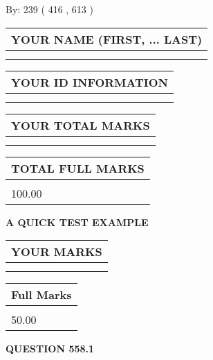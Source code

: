 \documentclass[12pt]{article}
\begin{document}
   
\hspace{1.0in} By: 
 239 ( 416 ,  613 )
   
   
   
   
\newpage 
\setcounter{page}{ 
   558001 } 
   
   
   
   
\noindent\begin{tabular}{|l|}
\hline
YOUR NAME (FIRST, ... LAST)  \\
\hline
 \\ 
 \\ 
\hline
\end{tabular}
\hspace{0.05in} \begin{tabular}{|l|}
\hline
 YOUR   ID   INFORMATION  \\
\hline
 \\ 
 \\ 
\hline
\end{tabular}
   
   
\vspace{0.2in}\noindent\begin{tabular}{|l|}
\hline
YOUR TOTAL MARKS  \\
\hline
 \\ 
 \\ 
\hline
\end{tabular}
\hspace{0.05in} \begin{tabular}{|l|}
\hline
TOTAL FULL MARKS  \\
\hline
 \\ 
100.00 \\
\hline
\end{tabular}
   
   
 \vspace{0.2in}
{\LARGE {\textbf{ A QUICK TEST EXAMPLE}}}
   
   
  
\vspace{0.2in}
  
\noindent\begin{tabular}{|l|}
\hline
 YOUR MARKS  \\
\hline
 \\ 
 \\ 
\hline
\end{tabular}
\hspace{0.05in} \begin{tabular}{|l|}
\hline
 Full Marks  \\
\hline
 \\ 
50.00 \\
\hline
\end{tabular}
{\textbf{\Large{QUESTION
558.1 
}}}
  
\end{document}
